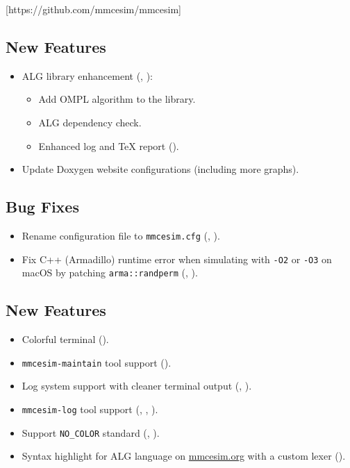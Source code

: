 [https://github.com/mmcesim/mmcesim]
\subsection*{New Features}
\begin{itemize}
  \item ALG library enhancement (, ):
  \begin{itemize}
    \item Add OMPL \cite{zhao2023ompl} algorithm to the library.
    \item ALG dependency check.
    \item Enhanced log and \TeX{} report ().
  \end{itemize}
  \item Update Doxygen website configurations (including more graphs).
\end{itemize}
\subsection*{Bug Fixes}
\begin{itemize}
  \item Rename configuration file to \texttt{mmcesim.cfg} (, ).
  \item Fix C++ (Armadillo) runtime error when simulating with \texttt{-O2} or \texttt{-O3} on macOS by patching \texttt{arma::randperm} (, ).
\end{itemize}

\subsection*{New Features}
\begin{itemize}
  \item Colorful terminal ().
  \item \texttt{mmcesim-maintain} tool support ().
  \item Log system support with cleaner terminal output (, ).
  \item \texttt{mmcesim-log} tool support (, , ).
  \item Support \texttt{NO\_COLOR} standard (, ).
  \item Syntax highlight for ALG language on \href{https://mmcesim.org}{mmcesim.org} with a custom lexer ().
\end{itemize}
